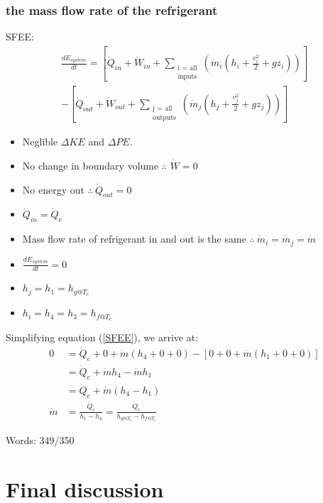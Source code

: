 \documentclass[12pt]{article}
\numberwithin{equation}{section}
\begin{document}
\begin{flushleft}
\subsubsection[Refrigerant mass flow rate.]{the mass flow rate of the refrigerant}
SFEE:
\begin{multline}
  \frac{dE_{system}}{dt} = \left[ \dot{Q}_{in} + \dot{W}_{in} + \sum_{\substack{\text{i = all} \\ \text{inputs}}} \left( \dot{m}_i (h_i + \frac{v_i^2}{2} + gz_i) \right) \right] \\ - \left[ \dot{Q}_{out} + \dot{W}_{out} + \sum_{\substack{\text{j = all} \\ \text{outputs}}} \left( \dot{m}_j (h_j + \frac{v_j^2}{2} + gz_j) \right) \right]
  \label{SFEE}
\end{multline}
\begin{itemize}
  \item Neglible $\Delta KE$ and $\Delta PE$.
  \item No change in boundary volume $\therefore$ $\dot{W} = 0$
  \item No energy out $\therefore \ \dot{Q}_{out} = 0$
  \item $\dot{Q}_{in} = \dot{Q}_e$
  \item Mass flow rate of refrigerant in and out is the same $\therefore \ \dot{m}_i =\dot{m}_j = \dot{m}$
  \item $\frac{dE_{system}}{dt} = 0$
  \item $h_j = h_1 = h_{g@T_e}$
  \item $h_i = h_4 = h_3 = h_{f@T_c}$
\end{itemize}  
Simplifying equation (\ref{SFEE}), we arrive at:
\begin{align}
  0 &= \dot{Q}_{e} + 0 + \dot{m} (h_4 + 0 + 0) - \left[ 0 + 0 +  \dot{m} (h_1 + 0 + 0) \right]\\
  &= \dot{Q}_{e} + \dot{m} h_4 - \dot{m} h_1\\
  &= \dot{Q}_{e} + \dot{m} (h_4 - h_1)\\
  \dot{m} &= \frac{\dot{Q}_e}{h_1 - h_4} = \frac{\dot{Q}_e}{h_{g@T_e} - h_{f@T_c}}
\end{align}

Words: 349/350
\section{Final discussion}

\end{flushleft}
\end{document}
